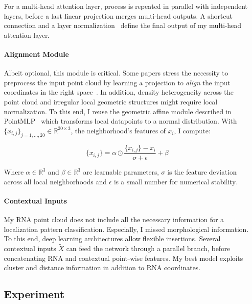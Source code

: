 For a multi-head attention layer, process is repeated in parallel with independent layers, before a last linear projection merges multi-head outputs.
A shortcut connection and a layer normalization~\cite{ba2016layer} define the final output of my multi-head attention layer.

\paragraph{Alignment Module}

Albeit optional, this module is critical.
Some papers stress the necessity to preprocess the input point cloud by learning a projection to \emph{align} the input coordinates in the right space~\cite{Qi_2017_CVPR,Wang_2019}.
In addition, density heterogeneity across the point cloud and irregular local geometric structures might require local normalization.
To this end, I reuse the geometric affine module described in PointMLP~\cite{ma2022rethinking} which transforms local datapoints to a normal distribution.
With $\{x_{i, j}\}_{j=1,\dots,20} \in \mathbb{R}^{20 \times 3}$, the neighborhood's features of $x_i$, I compute:

\begin{equation}
	{\displaystyle \{x_{i, j}\} = \alpha \odot \frac{\{x_{i, j}\} - x_i}{\sigma + \epsilon} + \beta}
\end{equation}

\noindent
Where $\alpha \in \mathbb{R}^3$ and $\beta \in \mathbb{R}^3$ are learnable parameters, $\sigma$ is the feature deviation across all local neighborhoods and $\epsilon$ is a small number for numerical stability.

\paragraph{Contextual Inputs}

My \ac{RNA} point cloud does not include all the necessary information for a localization pattern classification.
Especially, I missed morphological information.
To this end, deep learning architectures allow flexible insertions.
Several contextual inputs $\tilde{X}$ can feed the network through a parallel branch, before concatenating \ac{RNA} and contextual point-wise features.
My best model exploits cluster and distance information in addition to \ac{RNA} coordinates.

\subsection{Experiment}
\label{subsec:experiment}

